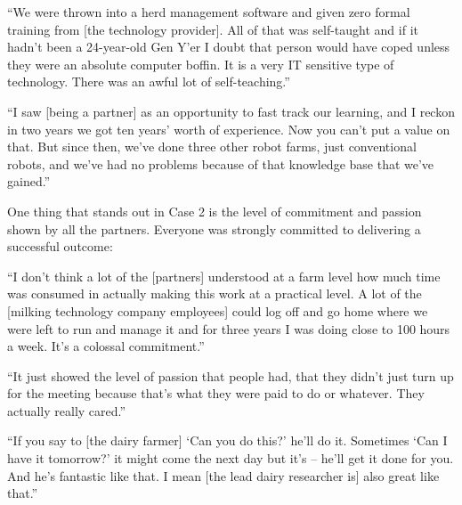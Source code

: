 \begin{displayquote}[Participant 1/2]
\small
\enquote{We were thrown into a herd management software and given zero formal training from [the technology provider]. All of that was self-taught and if it hadn't been a 24-year-old Gen Y'er I doubt that person would have coped unless they were an absolute computer boffin. It is a very IT sensitive type of technology. There was an awful lot of self-teaching.} 
\end{displayquote}


\begin{displayquote}[Participant 15/2]
\small
\enquote{I saw [being a partner] as an opportunity to fast track our learning, and I reckon in two years we got ten years' worth of experience. Now you can't put a value on that. But since then, we've done three other robot farms, just conventional robots, and we've had no problems because of that knowledge base that we've gained.} 
\end{displayquote}


One thing that stands out in Case 2 is the level of commitment and passion shown by all the partners. Everyone was strongly committed to delivering a successful outcome:

\begin{displayquote}[Participant 1/2]
\small
\enquote{I don't think a lot of the [partners] understood at a farm level how much time was consumed in actually making this work at a practical level. A lot of the [milking technology company employees] could log off and go home where we were left to run and manage it and for three years I was doing close to 100 hours a week. It's a colossal commitment.} 
\end{displayquote}


\begin{displayquote}[Participant 8/2]
\small
\enquote{It just showed the level of passion that people had, that they didn't just turn up for the meeting because that's what they were paid to do or whatever. They actually really cared.} 
\end{displayquote}


\begin{displayquote}[Participant 9/2]
\small
\enquote{If you say to [the dairy farmer] \enquote{Can you do this?} he'll do it. Sometimes \enquote{Can I have it tomorrow?} it might come the next day but it's – he'll get it done for you. And he’s fantastic like that.  I mean [the lead dairy researcher is] also great like that.} 
\end{displayquote}


